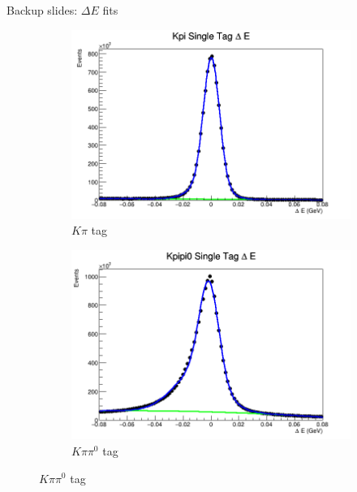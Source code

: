\documentclass{beamer}
\begin{document}
\begin{frame}{Backup slides: $\Delta E$ fits}
  \begin{figure}
    \centering
    \vspace{-0.2cm}
    \begin{subfigure}{0.5\textwidth}
      \includegraphics[width = 1\textwidth]{KpiDeltaE.png}
      \caption{$K\pi$ tag}
    \end{subfigure}%
    \begin{subfigure}{0.5\textwidth}
      \includegraphics[width = 1\textwidth]{Kpipi0DeltaE.png}
      \caption{$K\pi\pi^0$ tag}
    \end{subfigure}
  \end{figure}
\end{frame}
\end{document}

